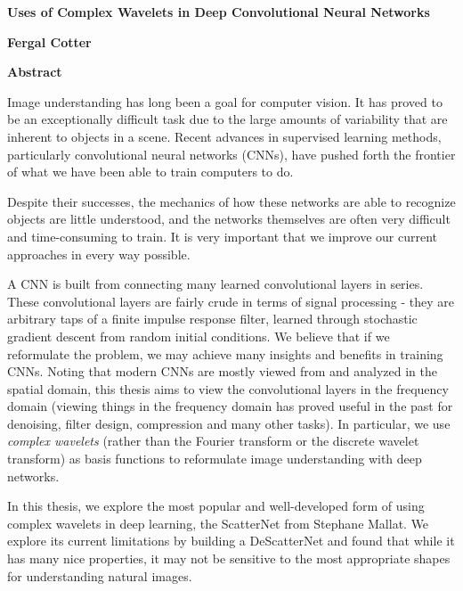 \cleardoublepage
\begin{center}
  \Large
  \textbf{Uses of Complex Wavelets in Deep Convolutional Neural Networks}
      
  \vspace{0.4cm}
  \textbf{Fergal Cotter}
     
  \vspace{0.9cm}
  \textbf{Abstract}
\end{center}

  Image understanding has long been a goal for computer vision. It has proved
  to be an exceptionally difficult task due to the large amounts of variability
  that are inherent to objects in a scene. Recent advances in supervised learning
  methods, particularly convolutional neural networks (CNNs), have pushed forth the frontier
  of what we have been able to train computers to do.

  Despite their successes, the mechanics of how these networks are able to
  recognize objects are little understood, and the networks themselves are often
  very difficult and time-consuming to train. It is very important that we improve our
  current approaches in every way possible.

  A CNN is built from connecting many learned convolutional layers in series.
  These convolutional layers are fairly crude in terms of signal
  processing - they are arbitrary taps of a finite impulse response filter,
  learned through stochastic gradient descent from random initial conditions. We
  believe that if we reformulate the problem, we may achieve many insights and
  benefits in training CNNs. Noting that modern CNNs are mostly viewed from and
  analyzed in the spatial domain, this thesis aims to view the convolutional
  layers in the frequency domain (viewing things in the frequency
  domain has proved useful in the past for denoising, filter
  design, compression and many other tasks). In particular, we use \emph{complex
  wavelets} (rather than the Fourier transform or the discrete wavelet
  transform) as basis functions to reformulate image understanding with deep
  networks.

  In this thesis, we explore the most popular and well-developed form of
  using complex wavelets in deep learning, the ScatterNet from Stephane Mallat.
  We explore its current limitations by building a DeScatterNet and found that
  while it has many nice properties, it may not be sensitive to the most
  appropriate shapes for understanding natural images.

